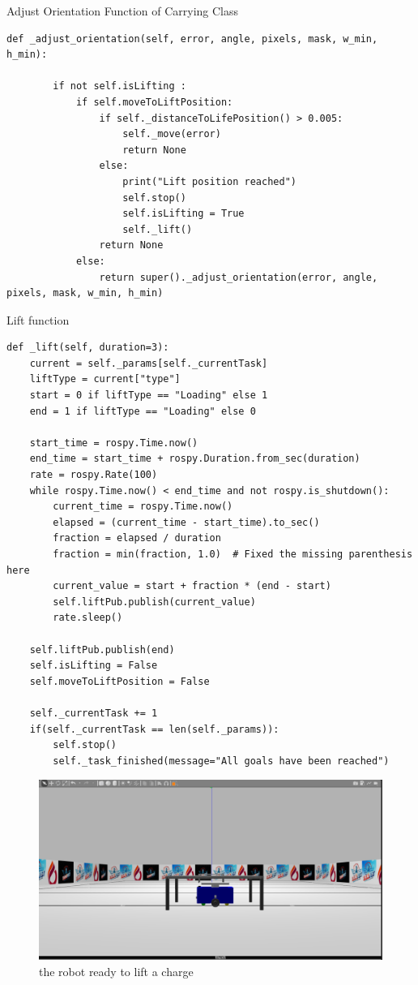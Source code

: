 \documentclass[../../main]{subfiles}
\begin{document}
\begin{codebox}[]{Adjust Orientation Function of Carrying Class}
  \begin{verbatim}
def _adjust_orientation(self, error, angle, pixels, mask, w_min, h_min):
        
        if not self.isLifting :
            if self.moveToLiftPosition:
                if self._distanceToLifePosition() > 0.005:
                    self._move(error)
                    return None
                else:
                    print("Lift position reached")
                    self.stop()
                    self.isLifting = True
                    self._lift()
                return None
            else:
                return super()._adjust_orientation(error, angle, pixels, mask, w_min, h_min)

\end{verbatim}
\end{codebox}

\begin{codebox}[]{Lift function}
  \begin{verbatim}
def _lift(self, duration=3):
    current = self._params[self._currentTask]
    liftType = current["type"]
    start = 0 if liftType == "Loading" else 1
    end = 1 if liftType == "Loading" else 0

    start_time = rospy.Time.now()
    end_time = start_time + rospy.Duration.from_sec(duration)
    rate = rospy.Rate(100)  
    while rospy.Time.now() < end_time and not rospy.is_shutdown():
        current_time = rospy.Time.now()
        elapsed = (current_time - start_time).to_sec()
        fraction = elapsed / duration
        fraction = min(fraction, 1.0)  # Fixed the missing parenthesis here
        current_value = start + fraction * (end - start)
        self.liftPub.publish(current_value)
        rate.sleep()

    self.liftPub.publish(end)
    self.isLifting = False
    self.moveToLiftPosition = False

    self._currentTask += 1
    if(self._currentTask == len(self._params)):
        self.stop()
        self._task_finished(message="All goals have been reached")
\end{verbatim}
\end{codebox}

\begin{figure}[h!]
\centering
\includegraphics[width=\textwidth]{img/image057.png}
\caption{the robot ready to lift a charge}
\end{figure}
\end{document}
